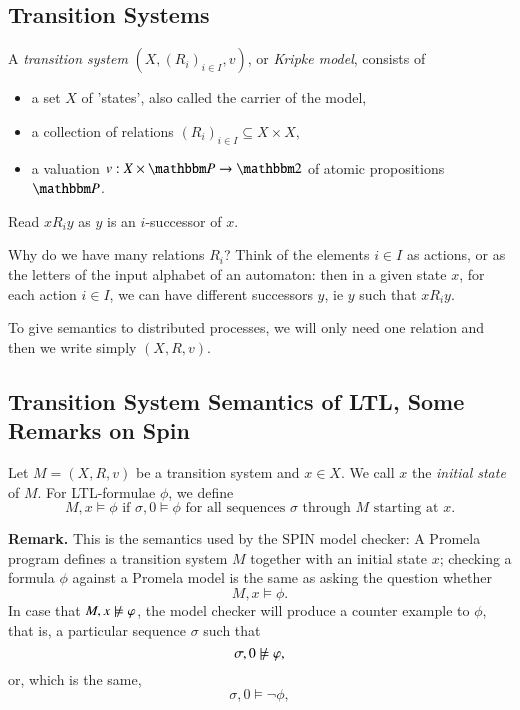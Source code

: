 \subsection{Transition Systems}

A \emph{transition system} $(X,(R_i)_{i\in I},v)$, or \emph{Kripke
  model}, consists of
\begin{itemize}
\item a set $X$ of 'states', also called the carrier of the model,
\item a collection of relations $(R_i)_{i\in I}\subseteq X\times X$,
\item a valuation $v:X\times\bbP\to\bbtwo$ of atomic propositions $\bbP$.
\end{itemize}

\noindent Read $xR_iy$ as $y$ is an $i$-successor of $x$.

\medskip\noindent Why do we have many relations $R_i$? Think of the elements
$i\in I$ as actions, or as the letters of the input alphabet of an
automaton: then in a given state $x$, for each action $i\in I$, we can
have different successors $y$, ie $y$ such that $xR_i y$.

\medskip\noindent To give semantics to distributed processes, we will only need one relation and then we write simply
$(X,R,v)$. 



\subsection{Transition System Semantics of LTL, Some Remarks on Spin}
%
Let $M=(X,R,v)$ be a transition system and $x\in X$. We call $x$ the
\emph{initial state} of $M$. For LTL-formulae $\phi$, we define
\[M,x\models\phi \textrm{ \ if \ } \sigma,0\models\phi \textrm{ for
  all sequences $\sigma$ through $M$ starting at $x$.}\]


\bigskip\noindent\textbf{Remark. }  This is the semantics used by the
SPIN model checker: A Promela program defines a transition system $M$
together with an initial state $x$; checking a formula $\phi$ against
a Promela model is the same as asking the question whether
\[M,x\models\phi.\]
In case that $M,x\notmodels\phi$, the model checker will produce a
counter example to $\phi$, that is, a particular sequence $\sigma$
such that \[\sigma,0 \notmodels\phi,\] or, which is the
same, \[\sigma,0 \models\neg\phi,\]

